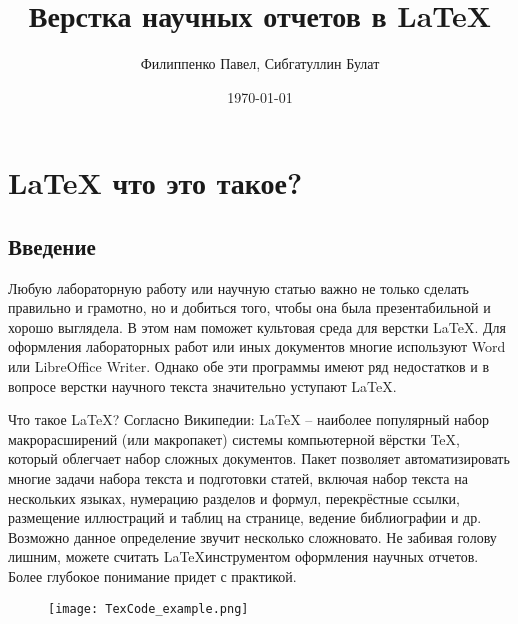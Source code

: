

\author{Филиппенко Павел, Сибгатуллин Булат}
\title{Верстка научных отчетов в \LaTeX{}}
\date{\today}

    
    \maketitle
    \thispagestyle{empty}

    \newpage
    \tableofcontents{} %
    \newpage

    \section{\LaTeX{} что это такое?}

    \subsection{Введение}

    Любую лабораторную работу или научную статью важно не только сделать правильно и грамотно, но и добиться того, чтобы она была презентабильной и хорошо выглядела. В этом нам поможет культовая среда для верстки \LaTeX{}.
    Для оформления лабораторных работ или иных документов многие используют Word или LibreOffice Writer. Однако обе эти программы имеют ряд недостатков и в вопросе верстки научного текста значительно уступают \LaTeX{}.

    Что такое \LaTeX{}?  
    Согласно Википедии: \LaTeX{} -- наиболее популярный набор макрорасширений (или макропакет) системы компьютерной вёрстки \TeX, который облегчает набор сложных документов. Пакет позволяет автоматизировать многие задачи набора текста и подготовки статей, включая набор текста на нескольких языках, нумерацию разделов и формул, перекрёстные ссылки, размещение иллюстраций и таблиц на странице, ведение библиографии и др.
    Возможно данное определение звучит несколько сложновато. Не забивая голову лишним, можете считать \LaTeX инструментом оформления научных отчетов. Более глубокое понимание придет с практикой.

    \begin{figure}[h!]
        \centering
        \texttt{[image: TexCode\_example.png]}
        \caption{}
    \end{figure}

    \newpage

